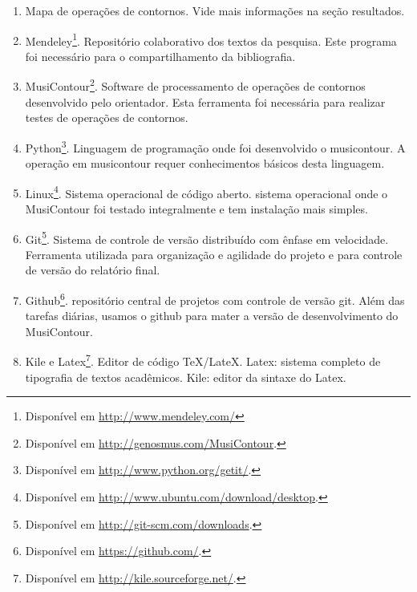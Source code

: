\documentclass[11pt]{article}
\begin{document}
\begin{enumerate}
\item Mapa de operações de contornos. Vide mais
  informações na seção resultados.
\item Mendeley\footnote{Disponível em
    \url{http://www.mendeley.com/}}. Repositório colaborativo dos
  textos da pesquisa. Este programa foi necessário para o
  compartilhamento da bibliografia.
\item MusiContour\footnote{Disponível em
    \url{http://genosmus.com/MusiContour}.}. Software de processamento
  de operações de contornos desenvolvido pelo orientador. Esta
  ferramenta foi necessária para realizar testes de operações de
  contornos.
\item Python\footnote{Disponível em
  \url{http://www.python.org/getit/}.}. Linguagem de programação onde foi
  desenvolvido o musicontour. A operação em musicontour requer conhecimentos
  básicos desta linguagem.
\item Linux\footnote{Disponível em
  \url{http://www.ubuntu.com/download/desktop}.}. Sistema operacional
  de código aberto.
 sistema operacional onde o MusiContour foi testado
 integralmente e tem instalação mais simples.
\item Git\footnote{Disponível em
  \url{http://git-scm.com/downloads}.}. Sistema de controle de versão
distribuído com ênfase em velocidade. Ferramenta utilizada para organização
e agilidade do projeto e para controle de versão do relatório final.
\item Github\footnote{Disponível em
  \url{https://github.com/}.}. repositório central de projetos com controle
  de versão git. Além das tarefas diárias, usamos o github para mater a versão
  de desenvolvimento do MusiContour.
\item Kile e Latex\footnote{Disponível em
  \url{http://kile.sourceforge.net/}.}. Editor de código
TeX/LateX. Latex: sistema completo de tipografia de textos acadêmicos. Kile: editor da
sintaxe do Latex.
\end{enumerate}
\end{document}
